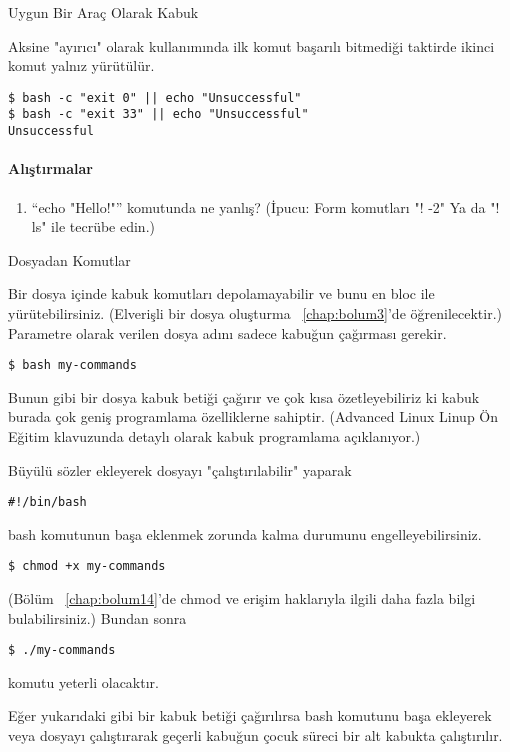 \begin{section}{Uygun Bir Araç Olarak Kabuk}
{Aksine "ayırıcı" olarak \textbar \textbar kullanımında ilk komut başarılı bitmediği taktirde ikinci komut yalnız yürütülür. 
\begin{verbatim}
$ bash -c "exit 0" || echo "Unsuccessful"
$ bash -c "exit 33" || echo "Unsuccessful"
Unsuccessful
\end{verbatim} }
\paragraph{{\Huge{\PencilLeftDown}}Alıştırmalar}{
\begin{enumerate}
\item “echo "Hello!"” komutunda ne yanlış? (İpucu: Form komutları "! -2" Ya da "! ls" ile tecrübe edin.)
\end{enumerate}
}
\end{section}
\begin{section}{Dosyadan Komutlar}

Bir dosya içinde kabuk komutları depolamayabilir ve bunu en bloc ile yürütebilirsiniz. (Elverişli bir dosya oluşturma ~\ref{chap:bolum3}'de öğrenilecektir.) Parametre olarak verilen dosya adını sadece kabuğun çağırması gerekir.
\begin{verbatim}
$ bash my-commands
\end{verbatim}

Bunun gibi bir dosya kabuk betiği çağırır ve çok kısa özetleyebiliriz ki kabuk burada çok geniş programlama özelliklerne sahiptir. (Advanced Linux Linup Ön Eğitim klavuzunda detaylı olarak kabuk programlama açıklanıyor.)

Büyülü sözler ekleyerek dosyayı "çalıştırılabilir" yaparak
\begin{verbatim}
#!/bin/bash
\end{verbatim}
		
bash komutunun başa eklenmek zorunda kalma durumunu engelleyebilirsiniz.
\begin{verbatim}
$ chmod +x my-commands
\end{verbatim}
		
(Bölüm ~\ref{chap:bolum14}'de chmod ve erişim haklarıyla ilgili daha fazla bilgi bulabilirsiniz.) Bundan sonra
\begin{verbatim}
$ ./my-commands
\end{verbatim}
komutu yeterli olacaktır.

Eğer yukarıdaki gibi bir kabuk betiği çağırılırsa bash komutunu başa ekleyerek veya dosyayı çalıştırarak geçerli kabuğun çocuk süreci bir alt kabukta çalıştırılır.


\end{section}
